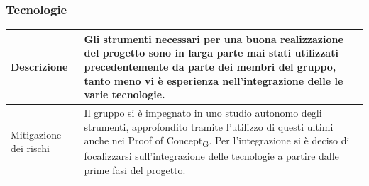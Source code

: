 \documentclass{article}
\begin{document}
\subsubsection{Tecnologie}\begin{center}
\begin{tabular}{|P{10em} |P{20em}|}
\hline
     Descrizione & Gli strumenti necessari per una buona realizzazione del progetto sono in larga parte mai stati utilizzati precedentemente da parte dei membri del gruppo, tanto meno vi è esperienza nell'integrazione delle le varie tecnologie.\\ 
     \hline
    Mitigazione dei rischi & Il gruppo si è impegnato in uno studio autonomo degli strumenti, approfondito tramite l'utilizzo di questi ultimi anche nei Proof of Concept\textsubscript{G}. Per l'integrazione si è deciso di focalizzarsi sull'integrazione delle tecnologie a partire dalle prime fasi del progetto.\\
    \hline
\end{tabular}
\label{tab:mittecnologie}
\end{center}
\end{document}
